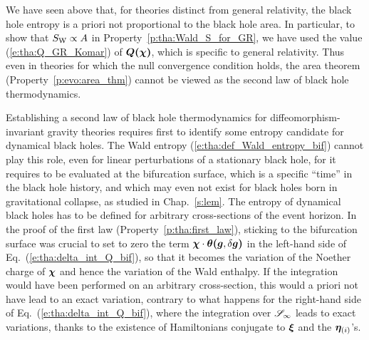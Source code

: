 We have seen above that, for theories distinct from general relativity,
the black hole entropy is a priori not proportional to the black hole area.
In particular, to show that $S_{\rm W} \propto A$ in Property~\ref{p:tha:Wald_S_for_GR},
we have used the value (\ref{e:tha:Q_GR_Komar}) of $\bm{Q}\textbf{(}\bm{\chi}\textbf{)}$,
which is specific to general relativity.
Thus even in theories for which the null convergence condition holds,
the area theorem (Property~\ref{p:evo:area_thm}) cannot be viewed as the
second law of black hole thermodynamics.

Establishing a second law of black hole thermodynamics for diffeomorphism-invariant
gravity theories requires first to identify some entropy candidate for
dynamical black holes. The Wald entropy (\ref{e:tha:def_Wald_entropy_bif})
cannot play this role, even for linear perturbations of a stationary black hole,
for it requires to be evaluated at the bifurcation surface, which is a
specific ``time'' in the black hole history, and which may even not exist
for black holes born in gravitational collapse, as studied in Chap.~\ref{s:lem}.
The entropy of dynamical black holes has to be defined for arbitrary cross-sections of the event horizon. In the proof of the first law (Property~\ref{p:tha:first_law}),
sticking to the bifurcation surface was crucial to set to zero the term
$\bm{\chi}\cdot\bm{\theta}\textbf{(}\bm{g},\delta\bm{g}\textbf{)}$ in the left-hand side of
Eq.~(\ref{e:tha:delta_int_Q_bif}), so that it becomes the variation of
the Noether charge of $\bm{\chi}$ and hence the variation of the Wald enthalpy.
If the integration would have been performed on an arbitrary cross-section,
this would a priori not have lead to an exact variation,
contrary to what happens for the right-hand side of Eq.~(\ref{e:tha:delta_int_Q_bif}),
where the integration over $\mathscr{S}_\infty$ leads to exact variations, thanks to
the existence of Hamiltonians conjugate
to $\bm{\xi}$ and the $\bm{\eta}_{(i)}$'s.

